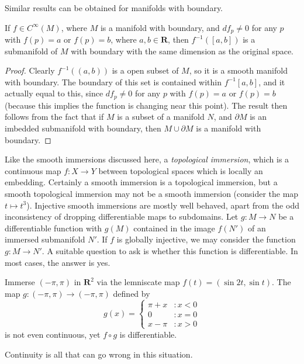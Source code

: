 Similar results can be obtained for manifolds with boundary.

\begin{theorem}
    If $f \in C^\infty(M)$, where $M$ is a manifold with boundary, and $df_p \neq 0$ for any $p$ with $f(p) = a$ or $f(p) = b$, where $a,b \in \mathbf{R}$, then $f^{-1}([a,b])$ is a submanifold of $M$ with boundary with the same dimension as the original space.
\end{theorem}
\begin{proof}
    Clearly $f^{-1}((a,b))$ is a open subset of $M$, so it is a smooth manifold with boundary. The boundary of this set is contained within $f^{-1}[a,b]$, and it actually equal to this, since $df_p \neq 0$ for any $p$ with $f(p) = a$ or $f(p) = b$ (because this implies the function is changing near this point). The result then follows from the fact that if $M$ is a subset of a manifold $N$, and $\partial M$ is an imbedded submanifold with boundary, then $M \cup \partial M$ is a manifold with boundary.
\end{proof}

Like the smooth immersions discussed here, a \emph{topological immersion}, which is a continuous map $f: X \to Y$ between topological spaces which is locally an embedding. Certainly a smooth immersion is a topological immersion, but a smooth topological immersion may not be a smooth immersion (consider the map $t \mapsto t^3$). Injective smooth immersions are mostly well behaved, apart from the odd inconsistency of dropping differentiable maps to subdomains. Let $g:M \to N$ be a differentiable function with $g(M)$ contained in the image $f(N')$ of an immersed submanifold $N'$. If $f$ is globally injective, we may consider the function $g:M \to N'$. A suitable question to ask is whether this function is differentiable. In most cases, the answer is yes.

\begin{example}
    Immerse $(-\pi, \pi)$ in $\mathbf{R}^2$ via the lemniscate map $f(t) = (\sin 2t, \sin t)$. The map $g:(-\pi, \pi) \to (-\pi, \pi)$ defined by
    \[ g(x) = \begin{cases} \pi + x &: x < 0 \\ 0 &: x = 0 \\ x - \pi &: x > 0 \end{cases} \]
    is not even continuous, yet $f \circ g$ is differentiable.
\end{example}

Continuity is all that can go wrong in this situation.

